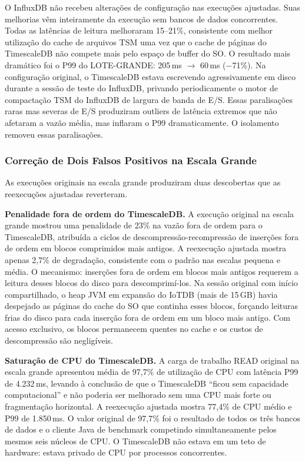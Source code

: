 O InfluxDB não recebeu alterações de configuração nas execuções ajustadas. Suas melhorias
vêm inteiramente da execução sem bancos de dados concorrentes. Todas as latências de leitura
melhoraram 15--21\%, consistente com melhor utilização do cache de arquivos TSM uma vez que
o cache de páginas do TimescaleDB não compete mais pelo espaço de buffer do SO. O resultado
mais dramático foi o P99 do LOTE-GRANDE: 205\,ms $\to$ 60\,ms ($-$71\%). Na configuração
original, o TimescaleDB estava escrevendo agressivamente em disco durante a sessão de teste
do InfluxDB, privando periodicamente o motor de compactação TSM do InfluxDB de largura de
banda de E/S. Essas paralisações raras mas severas de E/S produziram outliers de latência
extremos que não afetaram a vazão média, mas inflaram o P99 dramaticamente. O isolamento
removeu essas paralisações.

\subsubsection{Correção de Dois Falsos Positivos na Escala Grande}

As execuções originais na escala grande produziram duas descobertas que as reexecuções
ajustadas reverteram.

\textbf{Penalidade fora de ordem do TimescaleDB.} A execução original na escala grande
mostrou uma penalidade de 23\% na vazão fora de ordem para o TimescaleDB, atribuída a ciclos
de descompressão-recompressão de inserções fora de ordem em blocos comprimidos mais antigos.
A reexecução ajustada mostra apenas 2,7\% de degradação, consistente com o padrão nas
escalas pequena e média. O mecanismo: inserções fora de ordem em blocos mais antigos requerem
a leitura desses blocos do disco para descomprimí-los. Na sessão original com início
compartilhado, o heap JVM em expansão do IoTDB (mais de 15\,GB) havia despejado as páginas
do cache do SO que continha esses blocos, forçando leituras frias do disco para cada inserção
fora de ordem em um bloco mais antigo. Com acesso exclusivo, os blocos permanecem quentes no
cache e os custos de descompressão são negligíveis.

\textbf{Saturação de CPU do TimescaleDB.} A carga de trabalho READ original na escala grande
apresentou média de 97,7\% de utilização de CPU com latência P99 de 4.232\,ms, levando à
conclusão de que o TimescaleDB ``ficou sem capacidade computacional'' e não poderia ser
melhorado sem uma CPU mais forte ou fragmentação horizontal. A reexecução ajustada mostra
77,4\% de CPU médio e P99 de 1.850\,ms. O valor original de 97,7\% foi o resultado de todos
os três bancos de dados e o cliente Java de benchmark competindo simultaneamente pelos mesmos
seis núcleos de CPU. O TimescaleDB não estava em um teto de hardware: estava privado de CPU
por processos concorrentes.


